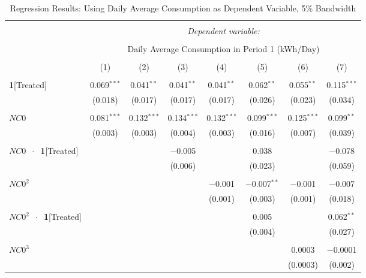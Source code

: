 \begin{table}[!htbp]
\centering 
\caption{Regression Results: Using Daily Average Consumption as Dependent Variable, 5\% Bandwidth} 
\label{Table:Regression-Results_Daily-Average_5P-BW} 
\small 
\begin{adjustbox}{scale = 0.65}
\begin{tabular}{@{\extracolsep{50pt}}lccccccc} 
\\[-1.8ex]\hline 
\hline \\[-1.8ex] 
 & \multicolumn{7}{c}{\textit{Dependent variable:}} \\ 
\cline{2-8} 
\\[-1.8ex] & \multicolumn{7}{c}{Daily Average Consumption in Period 1 (kWh/Day)} \\ 
\\[-1.8ex] & (1) & (2) & (3) & (4) & (5) & (6) & (7)\\ 
\hline \\[-1.8ex] 
 \textbf{1}[Treated] & 0.069$^{***}$ & 0.041$^{**}$ & 0.041$^{**}$ & 0.041$^{**}$ & 0.062$^{**}$ & 0.055$^{**}$ & 0.115$^{***}$ \\ 
  & (0.018) & (0.017) & (0.017) & (0.017) & (0.026) & (0.023) & (0.034) \\ 
  & & & & & & & \\ 
 $NC0$ & 0.081$^{***}$ & 0.132$^{***}$ & 0.134$^{***}$ & 0.132$^{***}$ & 0.099$^{***}$ & 0.125$^{***}$ & 0.099$^{**}$ \\ 
  & (0.003) & (0.003) & (0.004) & (0.003) & (0.016) & (0.007) & (0.039) \\ 
  & & & & & & & \\ 
 $NC0$ $\ \cdot \ $ \textbf{1}[Treated] &  &  & $-$0.005 &  & 0.038 &  & $-$0.078 \\ 
  &  &  & (0.006) &  & (0.023) &  & (0.059) \\ 
  & & & & & & & \\ 
 $NC0^{2}$ &  &  &  & $-$0.001 & $-$0.007$^{**}$ & $-$0.001 & $-$0.007 \\ 
  &  &  &  & (0.001) & (0.003) & (0.001) & (0.018) \\ 
  & & & & & & & \\ 
 $NC0^{2}$ $\ \cdot \ $ \textbf{1}[Treated] &  &  &  &  & 0.005 &  & 0.062$^{**}$ \\ 
  &  &  &  &  & (0.004) &  & (0.027) \\ 
  & & & & & & & \\ 
 $NC0^{3}$ &  &  &  &  &  & 0.0003 & $-$0.0001 \\ 
  &  &  &  &  &  & (0.0003) & (0.002) \\ 

\end{tabular}
\end{adjustbox}
\end{table}
